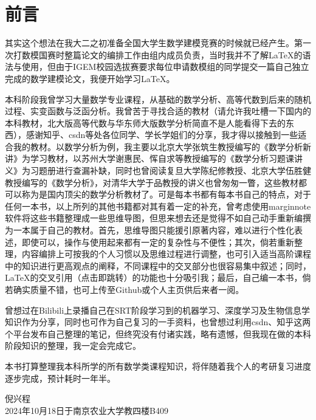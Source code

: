 
\chapter*{前言}
\hspace{2em}其实这个想法在我大二之初准备全国大学生数学建模竞赛的时候就已经产生。第一次打数模国赛时整篇论文的编排工作由组内成员负责，当时我并不了解\LaTeX{}的语法与使用，但由于IGEM校园选拔赛要求每位申请数模组的同学提交一篇自己独立完成的数学建模论文，我便开始学习\LaTeX{}。\par
本科阶段我曾学习大量数学专业课程，从基础的数学分析、高等代数到后来的随机过程、实变函数与泛函分析。我曾苦于寻找合适的教材（请允许我吐槽一下国内的本科教材，北大版高等代数与华东师大版数学分析简直不是人能看得下去的东西），感谢知乎、csdn等处各位同学、学长学姐们的分享，我才得以接触到一些适合我的教材。以数学分析为例，我主要以北京大学张筑生教授编写的《数学分析新讲》为学习教材，以苏州大学谢惠民、恽自求等教授编写的《数学分析习题课讲义》为习题册进行查漏补缺，同时也曾阅读复旦大学陈纪修教授、北京大学伍胜健教授编写的《数学分析》，对清华大学于品教授的讲义也曾匆匆一瞥，这些教材都可以称为是国内顶尖的数学分析教材了。可是每本书都有每本书自己的特点，对于任何一本书，以上所列的其他书籍都对其有着一定的补充，曾考虑使用marginnote软件将这些书籍整理成一些思维导图，但思来想去还是觉得不如自己动手重新编撰为一本属于自己的教材。首先，思维导图只能援引原著内容，难以进行个性化表述，即使可以，操作与使用起来都有一定的复杂性与不便性；其次，倘若重新整理，内容编排上可按我的个人习惯以及思维过程进行调整，也可引入适当高阶课程中的知识进行更高观点的阐释，不同课程中的交叉部分也很容易集中叙述；同时，\LaTeX{}的交叉引用（点击即跳转）的功能也十分吸引我；最后，自己编一本书，倘若确实质量不错，也可上传至Github或个人主页供后来者一阅。\par
曾想过在Bilibili上录播自己在SRT阶段学习到的机器学习、深度学习及生物信息学知识作为分享，同时也可作为自己复习的一手资料，也曾想过利用csdn、知乎这两个平台发布自己整理的笔记，但终究没有付诸实践，略有遗憾，但我现在做的本科阶段知识的整理，我一定会完成它。\par
本书打算整理我本科所学的所有数学类课程知识，将伴随着我个人的考研复习进度逐步完成，预计耗时一年半。\par
\begin{flushright}
	倪兴程\\
	2024年10月18日于南京农业大学教四楼B409
\end{flushright}

